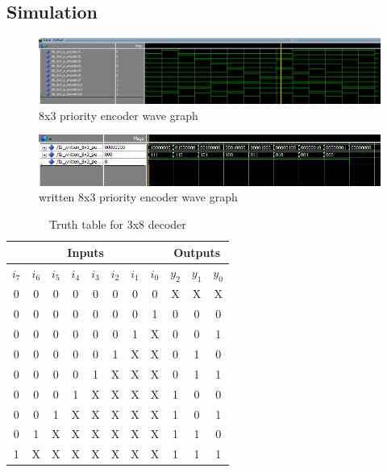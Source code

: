 \documentclass[12pt]{article}
\begin{document}
\subsection{Simulation}
\begin{figure}[h]
\caption{8x3 priority encoder wave graph}
\centering
\includegraphics[width=\textwidth]{./diagrams/8x3_p_enc_simulation.png}
\end{figure}

\begin{figure}[h]
\caption{written 8x3 priority encoder wave graph}
\centering
\includegraphics[width=\textwidth]{./diagrams/written_8x3_penc.png}
\end{figure}

\begin{table}[h]
    \begin{tabular}{|c|c|c|c|c|c|c|c||c|c|c|}
        \hline
        \multicolumn{8}{|c}{Inputs} & \multicolumn{3}{c|}{Outputs} \\
        \hline
        \( i_7 \) & \( i_6 \) & \( i_5 \) & \( i_4 \) & \( i_3 \) & \( i_2 \) & \( i_1 \) & \( i_0 \) & \( y_2 \) & \( y_1 \) & \( y_0 \) \\
        \hline
        0 & 0 & 0 & 0 & 0 & 0 & 0 & 0 & X & X & X \\
        \hline
        0 & 0 & 0 & 0 & 0 & 0 & 0 & 1 & 0 & 0 & 0 \\
        \hline
        0 & 0 & 0 & 0 & 0 & 0 & 1 & X & 0 & 0 & 1 \\
        \hline
        0 & 0 & 0 & 0 & 0 & 1 & X & X & 0 & 1 & 0 \\
        \hline
        0 & 0 & 0 & 0 & 1 & X & X & X & 0 & 1 & 1 \\
        \hline
        0 & 0 & 0 & 1 & X & X & X & X & 1 & 0 & 0 \\
        \hline
        0 & 0 & 1 & X & X & X & X & X & 1 & 0 & 1 \\
        \hline
        0 & 1 & X & X & X & X & X & X & 1 & 1 & 0 \\
        \hline
        1 & X & X & X & X & X & X & X & 1 & 1 & 1 \\
        \hline
    \end{tabular}
    \caption{Truth table for 3x8 decoder}
\end{table}
\end{document}
